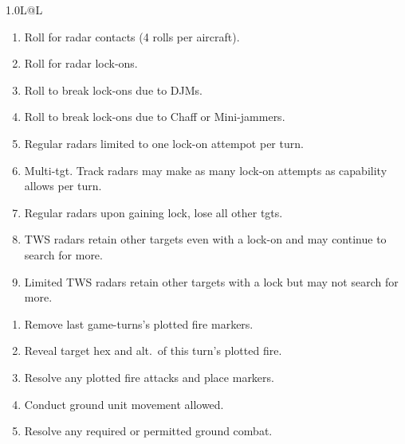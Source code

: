 \begin{twocolumntablefloat}
\begin{twocolumntable}
\begin{tabularx}{1.0\linewidth}{L@{\hspace{\columnsep}}L}
\begin{enumerate}[nosep]
    \item Roll for radar contacts (4 rolls per aircraft).
    \item Roll for radar lock-ons.
    \item Roll to break lock-ons due to DJMs.
    \item Roll to break lock-ons due to Chaff or Mini-jammers.
    \item[--] Regular radars limited to one lock-on attempot per turn.
    \item[--] Multi-tgt. Track radars may make as many lock-on attempts as capability allows per turn.
    \item[--] Regular radars upon gaining lock, lose all other tgts.
    \item[--] TWS radars retain other targets even with a lock-on and may continue to search for more.
    \item[--] Limited TWS radars retain other targets with a lock but may not search for more.    
\end{enumerate}


\begin{enumerate}[nosep]
    \item Remove last game-turns's plotted fire markers.
    \item Reveal target hex and alt.\ of this turn's plotted fire.
    \item Resolve any plotted fire attacks and place markers.
    \item Conduct ground unit movement allowed.
    \item Resolve any required or permitted ground combat.
\end{enumerate}

\end{tabularx}
\end{twocolumntable}
\end{twocolumntablefloat}
